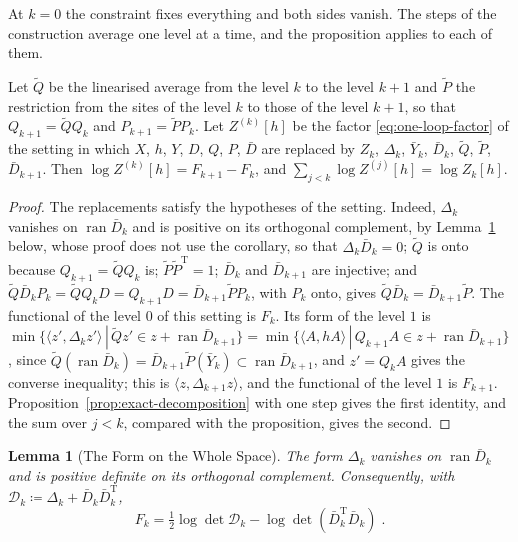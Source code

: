 \documentclass[11pt]{preprint}
\numberwithin{equation}{section}
\newtheorem{lemma}{Lemma}[section]
\theoremstyle{definition}
\theoremstyle{remark}
\theoremstyle{plain}
\begin{document}
At $k = 0$ the constraint fixes everything and both sides vanish. The steps of the construction average one level at a time, and the proposition applies to each of them.

\begin{corollary}\label{cor:one-step}
Let $\tilde Q$ be the linearised average from the level $k$ to the level $k + 1$ and $\tilde P$ the restriction from the sites of the level $k$ to those of the level $k + 1$, so that $Q_{k+1} = \tilde QQ_k$ and $P_{k+1} = \tilde PP_k$. Let $Z^{(k)}[h]$ be the factor \eqref{eq:one-loop-factor} of the setting in which $X$, $h$, $Y$, $D$, $Q$, $P$, $\bar D$ are replaced by $Z_k$, $\Delta_k$, $\bar Y_k$, $\bar D_k$, $\tilde Q$, $\tilde P$, $\bar D_{k+1}$. Then $\log Z^{(k)}[h] = F_{k+1} - F_k$, and $\sum_{j<k}\log Z^{(j)}[h] = \log Z_k[h]$.
\end{corollary}

\begin{proof}
The replacements satisfy the hypotheses of the setting. Indeed, $\Delta_k$ vanishes on $\operatorname{ran}\bar D_k$ and is positive on its orthogonal complement, by Lemma~\ref{lem:full-space-form} below, whose proof does not use the corollary, so that $\Delta_k\bar D_k = 0$; $\tilde Q$ is onto because $Q_{k+1} = \tilde QQ_k$ is; $\tilde P\tilde P^{\mathrm T} = 1$; $\bar D_k$ and $\bar D_{k+1}$ are injective; and $\tilde Q\bar D_kP_k = \tilde QQ_kD = Q_{k+1}D = \bar D_{k+1}\tilde PP_k$, with $P_k$ onto, gives $\tilde Q\bar D_k = \bar D_{k+1}\tilde P$. The functional of the level $0$ of this setting is $F_k$. Its form of the level $1$ is $\min\{ \langle z', \Delta_kz' \rangle \, | \, \tilde Qz' \in z + \operatorname{ran}\bar D_{k+1} \} = \min\{ \langle A, hA \rangle \, | \, Q_{k+1}A \in z + \operatorname{ran}\bar D_{k+1} \}$, since $\tilde Q(\operatorname{ran}\bar D_k) = \bar D_{k+1}\tilde P(\bar Y_k) \subset \operatorname{ran}\bar D_{k+1}$, and $z' = Q_kA$ gives the converse inequality; this is $\langle z, \Delta_{k+1}z \rangle$, and the functional of the level $1$ is $F_{k+1}$. Proposition~\ref{prop:exact-decomposition} with one step gives the first identity, and the sum over $j < k$, compared with the proposition, gives the second.
\end{proof}

\begin{lemma}[The Form on the Whole Space]\label{lem:full-space-form}
The form $\Delta_k$ vanishes on $\operatorname{ran}\bar D_k$ and is positive definite on its orthogonal complement. Consequently, with $\mathcal D_k \coloneqq \Delta_k + \bar D_k\bar D_k^{\mathrm T}$,
\begin{equation}\label{eq:level-functional-full}
    F_k = \tfrac12\log\det\mathcal D_k - \log\det(\bar D_k^{\mathrm T}\bar D_k)\;.
\end{equation}
\end{lemma}
\end{document}
